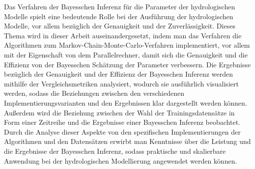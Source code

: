 Das Verfahren der Bayesschen Inferenz für die Parameter der hydrologischen Modelle spielt eine bedeutende Rolle bei der Ausführung der hydrologischen Modelle, vor allem bezüglich der Genauigkeit und der Zuverlässigkeit. Dieses Thema wird in dieser Arbeit auseinandergesetzt, indem man das Verfahren die Algorithmen zum Markov-Chain-Monte-Carlo-Verfahren implementiert, vor allem mit der Eigenschaft von dem Parallelrechner, damit sich die Genauigkeit und die Effizienz von der Bayesschen Schätzung der Parameter verbessern. Die Ergebnisse bezüglich der Genauigkeit und der Effizienz der Bayesschen Inferenz werden mithilfe der Vergleichsmetriken analysiert, wodurch sie ausführlich visualisiert werden, sodass die Beziehungen zwischen den verschiedenen Implementierungsvarianten und den Ergebnissen klar dargestellt werden können. Außerdem wird die Beziehung zwischen der Wahl der Trainingsdatensätze in Form einer Zeitreihe und die Ergebnisse einer Bayesschen Inferenz beobachtet. Durch die Analyse dieser Aspekte von den spezifischen Implementierungen der Algorithmen und den Datensätzen erwirbt man Kenntnisse über die Leistung und die Ergebnisse der Bayesschen Inferenz, sodass praktische und skalierbare Anwendung bei der hydrologischen Modellierung angewendet werden können.